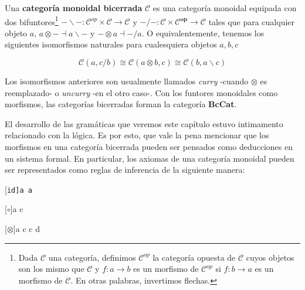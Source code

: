 \documentclass[../main.tex]{subfiles}
\begin{document}
	\begin{dfn}
	Una \textbf{categoría monoidal bicerrada} $\mathcal{C}$ es una categoría monoidal equipada con dos bifuntores\footnote{Dada $\mathcal{C}$ una categoría, definimos $\mathcal{C}^{op}$ la categoría opuesta de $\mathcal{C}$ cuyos objetos son los mismo que $\mathcal{C}$ y $f:a \to b$ es un morfismo de $\mathcal{C}^{op}$ si $f:b \to a$ es un morfismo de $\mathcal{C}$. En otras palabras, invertimos flechas.} $- \backslash - : \mathcal{C}^{op} \times \mathcal{C} \to \mathcal{C}$ y $- / - : \mathcal{C} \times \mathcal{C}^\textbf{op} \to \mathcal{C}$ 
	tales que para cualquier objeto $a$, $a \otimes - \dashv a \backslash -$ y $- \otimes a \dashv - / a$. O equivalentemente, tenemos los siguientes isomorfismos naturales para cualesquiera objetos $a,b,c$
	
	\begin{equation}
		\mathcal{C}(a,c/b) \cong \mathcal{C}(a \otimes b, c) \cong \mathcal{C}(b, a\backslash c)
		\label{curry}	
	\end{equation}
	
	
	\end{dfn}
	
	Los isomorfismos anteriores son usualmente llamados \textit{curry} -cuando $\otimes$ es reemplazado- o \textit{uncurry} -en el otro caso-. Con los funtores monoidales como morfismos, las categorías bicerradas forman la categoría \textbf{BcCat}.
	
	El desarrollo de las gramáticas que veremos este capítulo estuvo intimamento relacionado con la lógica. Es por esto, que vale la pena mencionar que los morfismos en una categoría bicerrada pueden ser pensados como deducciones en un sistema formal. En particular, los axiomas de una categoría monoidal pueden ser representados como reglas de inferencia de la siguiente manera: 
	\begin{multicols}{3}
		
		\begin{prooftree}
			{a \to a}
		\end{prooftree}
		\begin{prooftree}
			\hypo{a\to b}
			\hypo{b\to c}
			{a \to c}
		\end{prooftree}
		\begin{prooftree}
			\hypo{c \to d}
			[$\otimes$]{a \otimes c \to c \otimes d}
		\end{prooftree}
	\end{multicols}
	
\end{document}
